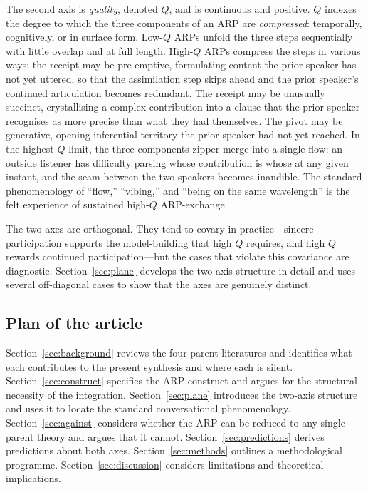 The second axis is \emph{quality}, denoted $Q$, and is continuous and positive. $Q$ indexes the degree to which the three components of an ARP are \emph{compressed}: temporally, cognitively, or in surface form. Low-$Q$ ARPs unfold the three steps sequentially with little overlap and at full length. High-$Q$ ARPs compress the steps in various ways: the receipt may be pre-emptive, formulating content the prior speaker has not yet uttered, so that the assimilation step skips ahead and the prior speaker's continued articulation becomes redundant. The receipt may be unusually succinct, crystallising a complex contribution into a clause that the prior speaker recognises as more precise than what they had themselves. The pivot may be generative, opening inferential territory the prior speaker had not yet reached. In the highest-$Q$ limit, the three components zipper-merge into a single flow: an outside listener has difficulty parsing whose contribution is whose at any given instant, and the seam between the two speakers becomes inaudible. The standard phenomenology of ``flow,'' ``vibing,'' and ``being on the same wavelength'' is the felt experience of sustained high-$Q$ ARP-exchange.

The two axes are orthogonal. They tend to covary in practice---sincere participation supports the model-building that high $Q$ requires, and high $Q$ rewards continued participation---but the cases that violate this covariance are diagnostic. Section~\ref{sec:plane} develops the two-axis structure in detail and uses several off-diagonal cases to show that the axes are genuinely distinct.

\subsection{Plan of the article}

Section~\ref{sec:background} reviews the four parent literatures and identifies what each contributes to the present synthesis and where each is silent. Section~\ref{sec:construct} specifies the ARP construct and argues for the structural necessity of the integration. Section~\ref{sec:plane} introduces the two-axis structure and uses it to locate the standard conversational phenomenology. Section~\ref{sec:against} considers whether the ARP can be reduced to any single parent theory and argues that it cannot. Section~\ref{sec:predictions} derives predictions about both axes. Section~\ref{sec:methods} outlines a methodological programme. Section~\ref{sec:discussion} considers limitations and theoretical implications.

